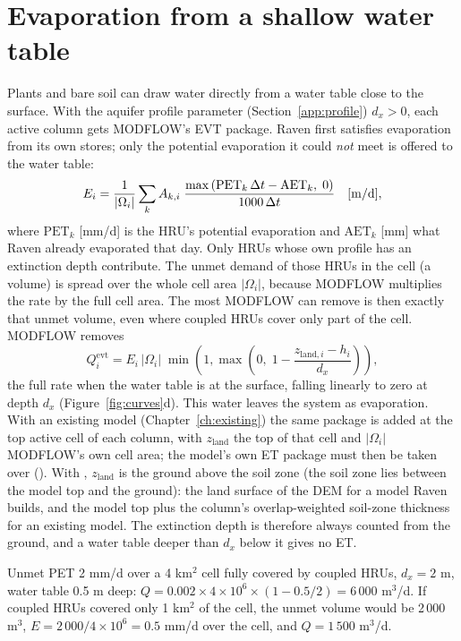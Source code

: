 \section{Evaporation from a shallow water table}\label{ch:et}
Plants and bare soil can draw water directly from a water table close to the surface. With the aquifer profile parameter  (Section~\ref{app:profile})
$d_x>0$, each active column gets MODFLOW's EVT package. Raven first satisfies evaporation from its own stores; only the
potential evaporation it could \emph{not} meet is offered to the water table:
\begin{equation}
E_i=\frac{1}{|\Omega_i|}\sum_kA_{k,i}\;\frac{\max\left(\mathrm{PET}_k\,\Delta t-\mathrm{AET}_k,\;0\right)}{1000\,\Delta t}\quad[\mathrm{m/d}],
\end{equation}
where $\mathrm{PET}_k$ [mm/d] is the HRU's potential evaporation and $\mathrm{AET}_k$ [mm] what Raven already evaporated
that day. Only HRUs whose own profile has an extinction depth contribute. The unmet demand of those HRUs in the cell (a volume) is spread over the whole cell area $|\Omega_i|$, because MODFLOW
multiplies the rate by the full cell area. The most MODFLOW can remove is then exactly that unmet volume, even where coupled
HRUs cover only part of the cell. MODFLOW removes
\begin{equation}
Q^{\mathrm{evt}}_i=E_i\,|\Omega_i|\;\min\!\left(1,\max\!\left(0,\;1-\frac{z_{\mathrm{land},i}-h_i}{d_x}\right)\right),
\end{equation}
the full rate when the water table is at the surface, falling linearly to zero at depth $d_x$ (Figure~\ref{fig:curves}d).
This water leaves the system as evaporation. With an existing model (Chapter~\ref{ch:existing}) the same package is added at the
top active cell of each column, with $z_{\mathrm{land}}$ the top of that cell and $|\Omega_i|$ MODFLOW's own cell area; the
model's own ET package must then be taken over (). With , $z_{\mathrm{land}}$ is
the ground above the soil zone (the soil zone lies between the model top and the ground): the land surface of the DEM for a
model Raven builds, and the model top plus the column's overlap-weighted soil-zone thickness for an existing model. The
extinction depth is therefore always counted from the ground, and a water table deeper than $d_x$ below it gives no ET.
\begin{example}
Unmet PET 2 mm/d over a 4 km$^2$ cell fully covered by coupled HRUs, $d_x=2$ m, water table 0.5 m deep:
$Q=0.002\times4\times10^6\times(1-0.5/2)=6\,000$ m$^3$/d. If coupled HRUs covered only 1 km$^2$ of the cell, the unmet volume
would be 2\,000 m$^3$, $E=2\,000/4\times10^6=0.5$ mm/d over the cell, and $Q=1\,500$ m$^3$/d.
\end{example}

